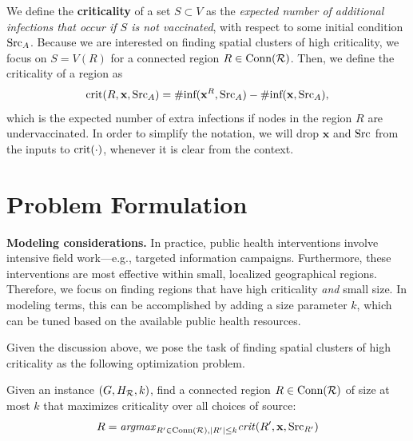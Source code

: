 \setlength{\abovedisplayskip}{3pt}
\setlength{\belowdisplayskip}{3pt}


We define the \textbf{criticality} of a set $S\subset V$ as
the \emph{expected number of additional infections that occur if $S$ is not vaccinated},
with respect to some initial condition $\text{Src}_A$.
Because we are interested on finding spatial clusters of high criticality, 
we focus on $S=V(R)$ for a connected region $R\in\text{Conn}(\mathcal{R})$.
Then, we define the criticality of a region as
\[
\text{crit}(R, \mathbf{x}, \text{Src}_A) = \#\text{inf}(\mathbf{x}^R, \text{Src}_A) - \#\text{inf}(\mathbf{x}, \text{Src}_A),
\]
which is the expected number of extra infections if nodes in the region $R$ are undervaccinated. In order to simplify the notation, we will drop $\mathbf{x}$ and $\text{Src}$ from the inputs to $\text{crit}(\cdot)$, whenever it is clear from the context.



\section{Problem Formulation}
\label{sec:problem-statement}

\noindent 
\textbf{Modeling considerations.} In practice, public health interventions involve intensive field work---e.g., targeted information campaigns. Furthermore, these interventions are most effective within small, localized geographical regions. Therefore, we focus on finding regions that have high criticality \emph{and} small size. In modeling terms, this can be accomplished by adding a size parameter $k$, which can be tuned based on the available public health resources. 

Given the discussion above, we pose the task of finding spatial clusters of high criticality as the following optimization problem.
\begin{problem}[$\maxcrit{}(G, H_{\R}, k)$]
\label{prob:maxcrit}
Given an instance $(G, H_{\mathcal{R}}, k)$, find a connected region $R\in\text{Conn}(\mathcal{R})$ of size at most $k$ that maximizes criticality over all choices of source:
\[
R= \mbox{\emph{argmax}}_{R'\in\text{Conn}(\mathcal{R}), |R'|\leq k} \text{\emph{crit}}(R', \mathbf{x}, \text{Src}_{R'})
\]
\end{problem}


